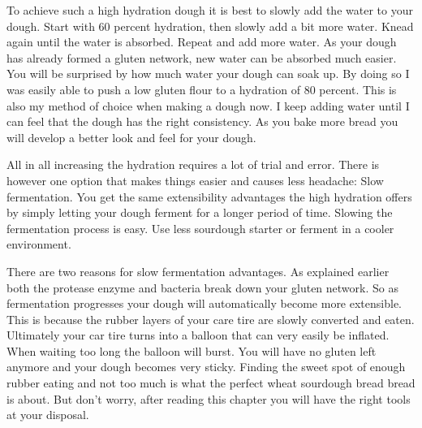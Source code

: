 To achieve such a high hydration dough it is best to slowly add the water to
your dough. Start with 60 percent hydration, then slowly add a bit more water. Knead
again until the water is absorbed. Repeat and add more water. As your dough
has already formed a gluten network, new water can be absorbed much easier.
You will be surprised by how much water your dough can soak up. By doing so I
was easily able to push a low gluten flour to a hydration of 80 percent. This
is also my method of choice when making a dough now. I keep adding water until
I can feel that the dough has the right consistency. As you bake more bread
you will develop a better look and feel for your dough.

All in all increasing the hydration requires a lot of trial and error. There
is however one option that makes things easier and causes less headache:
Slow fermentation. You get the same extensibility advantages the high hydration
offers by simply letting your dough ferment for a longer period of time.
Slowing the fermentation process is easy. Use less
sourdough starter or ferment in a cooler environment. 

There are two reasons for slow fermentation advantages.
As explained earlier both the protease enzyme and bacteria break down your
gluten network. So as fermentation progresses your dough will automatically
become more extensible. This is because the rubber layers of your care tire
are slowly converted and eaten. Ultimately your car tire turns into a balloon
that can very easily be inflated.  When waiting too long the
balloon will burst. You will have no gluten left anymore and your dough
becomes very sticky. Finding the sweet spot of enough rubber eating and not
too much is what the perfect wheat sourdough bread bread is about. But don't worry, after reading
this chapter you will have the right tools at your disposal.

